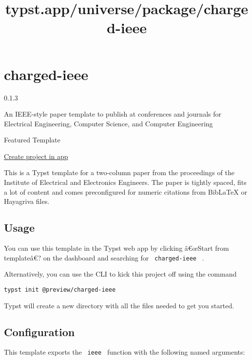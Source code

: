 \title{typst.app/universe/package/charged-ieee}

\label{banner}
\label{template-thumbnail}

\section{charged-ieee}\label{charged-ieee}

{ 0.1.3 }

An IEEE-style paper template to publish at conferences and journals for
Electrical Engineering, Computer Science, and Computer Engineering

{ } Featured Template

\href{/app?template=charged-ieee&version=0.1.3}{Create project in app}

\label{readme}
This is a Typst template for a two-column paper from the proceedings of
the Institute of Electrical and Electronics Engineers. The paper is
tightly spaced, fits a lot of content and comes preconfigured for
numeric citations from BibLaTeX or Hayagriva files.

\subsection{Usage}\label{usage}

You can use this template in the Typst web app by clicking â€œStart from
templateâ€? on the dashboard and searching for \texttt{\ charged-ieee\ }
.

Alternatively, you can use the CLI to kick this project off using the
command

\begin{verbatim}
typst init @preview/charged-ieee
\end{verbatim}

Typst will create a new directory with all the files needed to get you
started.

\subsection{Configuration}\label{configuration}

This template exports the \texttt{\ ieee\ } function with the following
named arguments:

